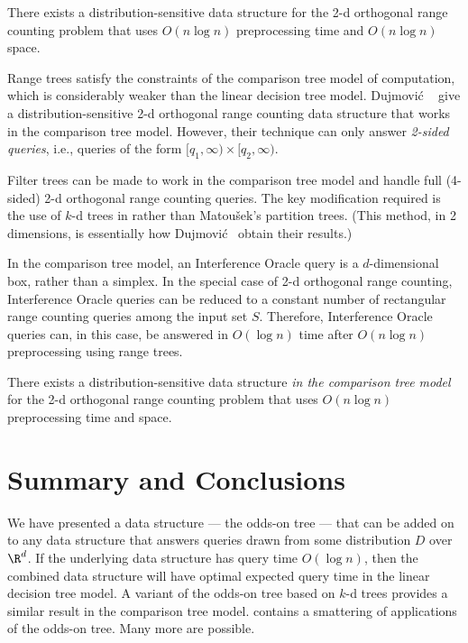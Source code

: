 \documentclass{patmorin}
\begin{document}
\begin{thm}
  There exists a distribution-sensitive data structure for the 2-d
  orthogonal range counting problem that uses $O(n\log n)$ preprocessing
  time and $O(n\log n)$ space.
\end{thm}

Range trees satisfy the constraints of the comparison tree model of
computation, which is considerably weaker than the linear decision tree
model. Dujmovi\'c \etal\ \cite{dhm09} give a distribution-sensitive 2-d
orthogonal range counting data structure that works in the comparison
tree model.  However, their technique can only answer \emph{2-sided
queries}, i.e., queries of the form $[q_1,\infty)\times[q_2,\infty)$.

Filter trees can be made to work in the comparison tree model
and handle full (4-sided) 2-d orthogonal range counting queries.
The key modification required is the use of $k$-d trees in
 rather than Matou\v{s}ek's partition
trees. (This method, in 2 dimensions, is essentially how Dujmovi\'c \etal\
obtain their results.)

In the comparison tree model, an Interference Oracle query is a
$d$-dimensional box, rather than a simplex. In the special case of 2-d
orthogonal range counting, Interference Oracle queries can be reduced to
a constant number of rectangular range counting queries among the input
set $S$.  Therefore, Interference Oracle queries can, in this case,
be answered in $O(\log n)$ time after $O(n\log n)$ preprocessing using
range trees.

\begin{thm}
  There exists a distribution-sensitive data structure \emph{in the
  comparison tree model} for the 2-d orthogonal range counting problem
  that uses $O(n\log n)$ preprocessing time and space.
\end{thm}

\section{Summary and Conclusions}

We have presented a data structure --- the odds-on tree --- that can
be added on to any data structure that answers queries drawn from some
distribution $D$ over $\R^d$.  If the underlying data structure has query
time $O(\log n)$, then the combined data structure will have optimal
expected query time in the linear decision tree model.  A variant of
the odds-on tree based on $k$-d trees provides a similar result in the
comparison tree model.  \secref{applications} contains a smattering of
applications of the odds-on tree.  Many more are possible.
\end{document}
